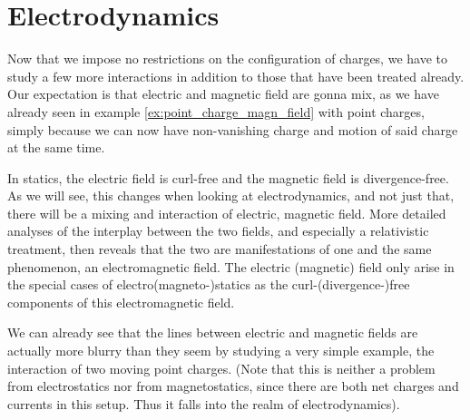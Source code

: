 \documentclass[../class_mech_main.tex]{subfiles}
\begin{document}
    \section{Electrodynamics}
Now that we impose no restrictions on the configuration of charges, we have to study a few more interactions in addition to those that have been treated already. Our expectation is that electric and magnetic field are gonna mix, as we have already seen in example \ref{ex:point_charge_magn_field} with point charges, simply because we can now have non-vanishing charge and motion of said charge at the same time.



In statics, the electric field is curl-free and the magnetic field is divergence-free. As we will see, this changes when looking at electrodynamics, and not just that, there will be a mixing and interaction of electric, magnetic field. More detailed analyses of the interplay between the two fields, and especially a relativistic treatment, then reveals that the two are manifestations of one and the same phenomenon, an electromagnetic field. The electric (magnetic) field only arise in the special cases of electro(magneto-)statics as the curl-(divergence-)free components of this electromagnetic field.


We can already see that the lines between electric and magnetic fields are actually more blurry than they seem by studying a very simple example, the interaction of two moving point charges. (Note that this is neither a problem from electrostatics nor from magnetostatics, since there are both net charges and currents in this setup. Thus it falls into the realm of electrodynamics).




\end{document}
